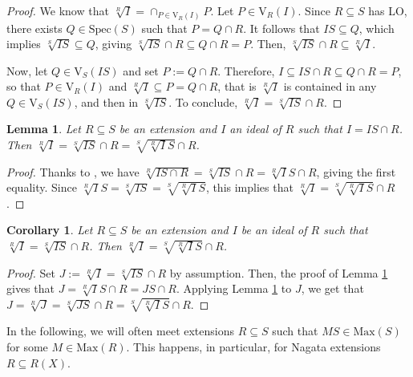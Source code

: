 \documentclass[12pt,leqno]{amsart}
\newtheorem{lemma}[theorem]{Lemma}
\newtheorem{corollary}[theorem]{Corollary}
\theoremstyle{definition}
\begin{document}
\begin{proof} We know that $\sqrt[R]I=\cap_{P\in\mathrm{V}_R(I)}P$. Let $ P\in\mathrm{V}_R(I)$. Since $R\subseteq S$ has LO, there exists $Q\in\mathrm{Spec}(S)$ such that $P=Q\cap R$. It follows that $IS\subseteq Q$, which implies $\sqrt[S]{IS}\subseteq Q$, giving $\sqrt[S]{IS}\cap R\subseteq Q\cap R=P$. Then, $\sqrt[S]{IS}\cap R\subseteq \sqrt[R]I$. 

Now, let $Q\in\mathrm{V}_S(IS)$ and set $P:=Q\cap R$. Therefore, $I\subseteq IS\cap R\subseteq Q\cap R=P$, so that $P\in\mathrm{V}_R(I)$ and $\sqrt[R]I\subseteq P=Q\cap R$, that is $\sqrt[R]I$ is contained in any $Q\in\mathrm{V}_S(IS)$, and then in $\sqrt[S]{IS}$. To conclude, $\sqrt[R]I =\sqrt[S]{IS}\cap R$.
\end{proof}

\begin{lemma}\label{3.26}Let $R\subseteq S$ be an extension and $I$ an ideal of $R$ such that $I=IS\cap R$. Then $\sqrt[R]I=\sqrt[S]{IS}\cap R=\sqrt[S]{\sqrt[R]IS}\cap R$.
\end{lemma}

\begin{proof} Thanks to \cite[Theorem 9, (16) and (22), p. 148]{ZS}, we have $\sqrt[R]{IS\cap R}=\sqrt[S]{IS}\cap R=\sqrt[R]IS\cap R$, giving the first equality. Since $\sqrt[R]IS=\sqrt[S]{IS}=\sqrt[S]{\sqrt[R]IS}$, this implies that $\sqrt[R]I=\sqrt[S]{\sqrt[R]IS}\cap R$.
\end{proof}

\begin{corollary}\label{3.27}Let $R\subseteq S$ be an extension and $I$ be an ideal of $R$ such that $\sqrt[R]I=\sqrt[S]{IS}\cap R$. Then $\sqrt[R]I=\sqrt[S]{\sqrt[R]IS}\cap R$.
\end{corollary}

\begin{proof} Set $J:=\sqrt[R]I=\sqrt[S]{IS}\cap R$ by assumption. Then, the proof of Lemma \ref{3.26} gives that $J=\sqrt[R]IS\cap R=JS\cap R$. Applying Lemma \ref{3.26} to $J$, we get that $J=\sqrt[R]J=\sqrt[S]{JS}\cap R=\sqrt[S]{\sqrt[R]IS}\cap R$.
\end{proof}


In the following, we will often meet extensions $R\subseteq S$ such that $MS\in\mathrm{Max}(S)$ for some $M\in\mathrm{Max}(R)$. This happens, in particular, for Nagata extensions $R\subseteq R(X)$.
\end{document}
